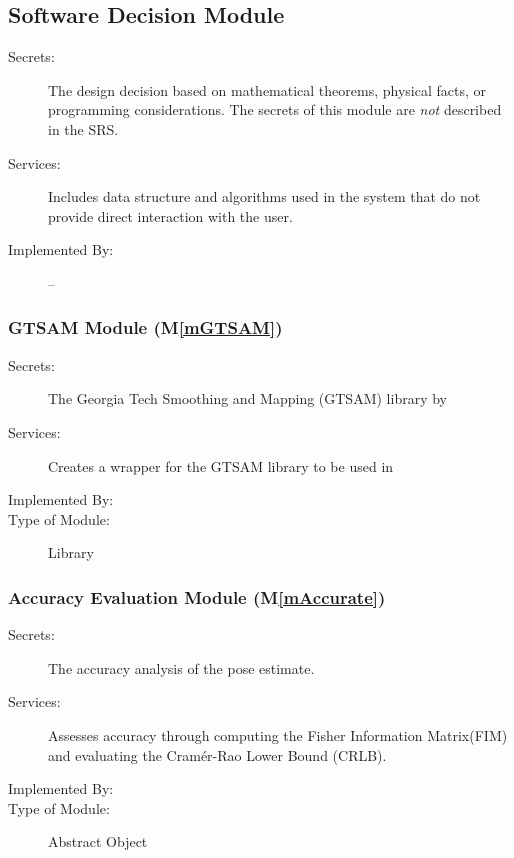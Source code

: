 \documentclass[12pt, titlepage]{article}
\newcommand{\mref}[1]{M\ref{#1}}
\begin{document}


\subsection{Software Decision Module}

\begin{description}
\item[Secrets:] The design decision based on mathematical theorems, physical
  facts, or programming considerations. The secrets of this module are
  \emph{not} described in the SRS.
\item[Services:] Includes data structure and algorithms used in the system that
  do not provide direct interaction with the user. 
\item[Implemented By:] --
\end{description}

\subsubsection{GTSAM Module (\mref{mGTSAM})}

\begin{description}
\item[Secrets:]The Georgia Tech Smoothing and Mapping (GTSAM) library by \cite{gtsam2022}
\item[Services:]Creates a wrapper for the GTSAM library to be used in \progname
\item[Implemented By:] \progname
\item[Type of Module:] Library
\end{description}

\subsubsection{Accuracy Evaluation Module (\mref{mAccurate})}

\begin{description}
\item[Secrets:]The accuracy analysis of the pose estimate.
\item[Services:]Assesses accuracy through computing the Fisher Information Matrix(FIM) and evaluating the Cram\'{e}r-Rao Lower Bound (CRLB).
\item[Implemented By:] \progname
\item[Type of Module:] Abstract Object
\end{description}
\end{document}
